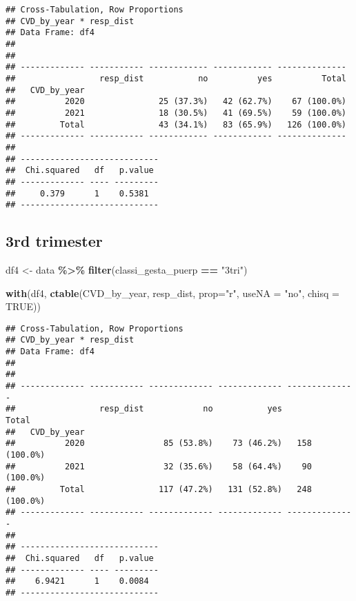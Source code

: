 \documentclass[
]{article}
\newenvironment{Shaded}{\begin{snugshade}}{\end{snugshade}}
\newcommand{\AttributeTok}[1]{\textcolor[rgb]{0.13,0.29,0.53}{#1}}
\newcommand{\ConstantTok}[1]{\textcolor[rgb]{0.56,0.35,0.01}{#1}}
\newcommand{\FunctionTok}[1]{\textcolor[rgb]{0.13,0.29,0.53}{\textbf{#1}}}
\newcommand{\NormalTok}[1]{#1}
\newcommand{\OtherTok}[1]{\textcolor[rgb]{0.56,0.35,0.01}{#1}}
\newcommand{\SpecialCharTok}[1]{\textcolor[rgb]{0.81,0.36,0.00}{\textbf{#1}}}
\newcommand{\StringTok}[1]{\textcolor[rgb]{0.31,0.60,0.02}{#1}}
\begin{document}
\begin{verbatim}
## Cross-Tabulation, Row Proportions  
## CVD_by_year * resp_dist  
## Data Frame: df4  
## 
## 
## ------------- ----------- ------------ ------------ --------------
##                 resp_dist           no          yes          Total
##   CVD_by_year                                                     
##          2020               25 (37.3%)   42 (62.7%)    67 (100.0%)
##          2021               18 (30.5%)   41 (69.5%)    59 (100.0%)
##         Total               43 (34.1%)   83 (65.9%)   126 (100.0%)
## ------------- ----------- ------------ ------------ --------------
## 
## ----------------------------
##  Chi.squared   df   p.value 
## ------------- ---- ---------
##     0.379      1    0.5381  
## ----------------------------
\end{verbatim}

\hypertarget{rd-trimester-1}{%
\subsection{3rd trimester}\label{rd-trimester-1}}

\begin{Shaded}
\begin{Highlighting}[]
\NormalTok{df4 }\OtherTok{\textless{}{-}}\NormalTok{ data }\SpecialCharTok{\%\textgreater{}\%} 
  \FunctionTok{filter}\NormalTok{(classi\_gesta\_puerp }\SpecialCharTok{==} \StringTok{"3tri"}\NormalTok{)}

\FunctionTok{with}\NormalTok{(df4, }\FunctionTok{ctable}\NormalTok{(CVD\_by\_year,  resp\_dist, }\AttributeTok{prop=}\StringTok{"r"}\NormalTok{, }\AttributeTok{useNA =} \StringTok{"no"}\NormalTok{, }\AttributeTok{chisq =} \ConstantTok{TRUE}\NormalTok{))}
\end{Highlighting}
\end{Shaded}

\begin{verbatim}
## Cross-Tabulation, Row Proportions  
## CVD_by_year * resp_dist  
## Data Frame: df4  
## 
## 
## ------------- ----------- ------------- ------------- --------------
##                 resp_dist            no           yes          Total
##   CVD_by_year                                                       
##          2020                85 (53.8%)    73 (46.2%)   158 (100.0%)
##          2021                32 (35.6%)    58 (64.4%)    90 (100.0%)
##         Total               117 (47.2%)   131 (52.8%)   248 (100.0%)
## ------------- ----------- ------------- ------------- --------------
## 
## ----------------------------
##  Chi.squared   df   p.value 
## ------------- ---- ---------
##    6.9421      1    0.0084  
## ----------------------------
\end{verbatim}
\end{document}
